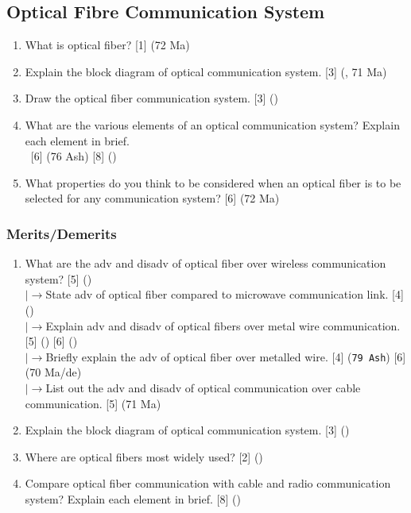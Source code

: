 \documentclass[12pt]{article}
\newcommand{\lb}{\\$\left|\rightarrow\right.$}
\newcommand{\enter}{\\\textcolor{white}{1}}
\begin{document}
  \subsection{Optical Fibre Communication System}
    \begin{enumerate}
      \item What is optical fiber? \hfill [1] (72 Ma)

      \item Explain the block diagram of optical communication system. \hfill [3] (, 71 Ma)

      \item Draw the optical fiber communication system. \hfill [3] ()

      \item What are the various elements of an optical communication system? Explain each element in brief.
        \enter\hfill [6] (76 Ash) [8] ()

      \item What properties do you think to be considered when an optical fiber is to be selected for any communication system? \hspace{12.6cm} [6] (72 Ma)
    \end{enumerate}

    \subsubsection{Merits/Demerits}
      \begin{enumerate}
        \item What are the adv and disadv of optical fiber over wireless communication system? \hfill [5] ()  
          \lb State adv of optical fiber compared to microwave communication link. \hfill [4] ()
          \lb Explain adv and disadv of optical fibers over metal wire communication. \hfill [5] () [6] ()
          \lb Briefly explain the adv of optical fiber over metalled wire. \hfill [4] (\texttt{79 Ash}) [6] (70 Ma/de)
          \lb List out the adv and disadv of optical communication over cable communication. \hfill [5] (71 Ma) 

        \item Explain the block diagram of optical communication system. \hfill [3] ()

        \item Where are optical fibers most widely used? \hfill [2] ()

        \item Compare optical fiber communication with cable and radio communication system? Explain each element in brief. \hfill [8] ()
      \end{enumerate}
\end{document}
